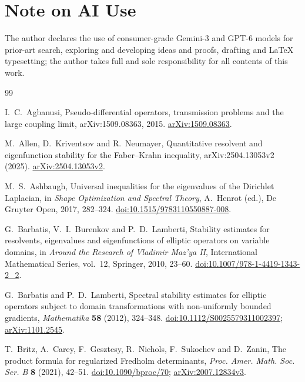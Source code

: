 \documentclass[11pt,reqno]{amsart}
\numberwithin{equation}{section}
\begin{document}
\section*{Note on AI Use}
The author declares the use of consumer-grade Gemini-3 and GPT-6 models for prior-art search, exploring and developing ideas and proofs, drafting and LaTeX typesetting; the author takes full and sole responsibility for all contents of this work.

\begin{thebibliography}{99}

I.~C.~Agbanusi,
Pseudo-differential operators, transmission problems and the large
coupling limit,
arXiv:1509.08363, 2015.
\href{https://arxiv.org/abs/1509.08363}{arXiv:1509.08363}.

M.~Allen, D.~Kriventsov and R.~Neumayer,
Quantitative resolvent and eigenfunction stability for the
Faber--Krahn inequality,
arXiv:2504.13053v2 (2025).
\href{https://arxiv.org/abs/2504.13053v2}{arXiv:2504.13053v2}.

M.~S.~Ashbaugh,
Universal inequalities for the eigenvalues of the Dirichlet Laplacian,
in \emph{Shape Optimization and Spectral Theory}, A.~Henrot (ed.),
De Gruyter Open, 2017, 282--324.
\href{https://doi.org/10.1515/9783110550887-008}{doi:10.1515/9783110550887-008}.

G.~Barbatis, V.~I.~Burenkov and P.~D.~Lamberti,
Stability estimates for resolvents, eigenvalues and eigenfunctions
of elliptic operators on variable domains,
in \emph{Around the Research of Vladimir Maz'ya II},
International Mathematical Series, vol.~12, Springer, 2010, 23--60.
\href{https://doi.org/10.1007/978-1-4419-1343-2_2}
{doi:10.1007/978-1-4419-1343-2\_2}.

G.~Barbatis and P.~D.~Lamberti,
Spectral stability estimates for elliptic operators subject to
domain transformations with non-uniformly bounded gradients,
\emph{Mathematika} \textbf{58} (2012), 324--348.
\href{https://doi.org/10.1112/S0025579311002397}
{doi:10.1112/S0025579311002397};
\href{https://arxiv.org/abs/1101.2545}{arXiv:1101.2545}.

T.~Britz, A.~Carey, F.~Gesztesy, R.~Nichols, F.~Sukochev and D.~Zanin,
The product formula for regularized Fredholm determinants,
\emph{Proc. Amer. Math. Soc. Ser. B} \textbf{8} (2021), 42--51.
\href{https://doi.org/10.1090/bproc/70}{doi:10.1090/bproc/70};
\href{https://arxiv.org/abs/2007.12834v3}{arXiv:2007.12834v3}.


\end{thebibliography}
\end{document}
